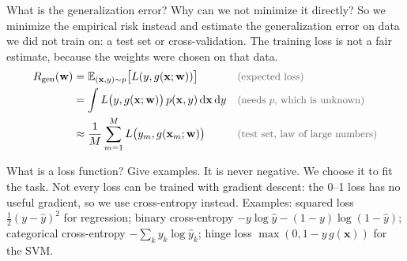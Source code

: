 \begin{qabox}{What is the generalization error? Why can we not minimize it directly?}
\explain So we minimize the empirical risk instead and estimate the generalization error on data we
did not train on: a test set or cross-validation. The training loss is not a fair estimate, because
the weights were chosen on that data.
\derive
\begin{align*}
\Rgen(\mathbf{w}) &= \mathbb{E}_{(\mathbf{x},y)\sim p}\bigl[L(y,g(\mathbf{x};\mathbf{w}))\bigr] \why{expected loss} \\
&= \int L\bigl(y,g(\mathbf{x};\mathbf{w})\bigr)\,p(\mathbf{x},y)\,\mathrm{d}\mathbf{x}\,\mathrm{d}y \why{needs $p$, which is unknown} \\
&\approx \frac{1}{M}\sum_{m=1}^{M} L\bigl(y_m,g(\mathbf{x}_m;\mathbf{w})\bigr) \why{test set, law of large numbers}
\end{align*}
\end{qabox}

\begin{qabox}{What is a loss function? Give examples.}
\explain It is never negative. We choose it to fit the task. Not every loss can be trained with
gradient descent: the 0--1 loss has no useful gradient, so we use cross-entropy instead.
\explain Examples: squared loss $\tfrac12(y-\hat y)^2$ for regression; binary cross-entropy
$-y\log\hat y - (1-y)\log(1-\hat y)$; categorical cross-entropy $-\sum_k y_k\log\hat y_k$; hinge
loss $\max(0, 1 - y\,g(\mathbf{x}))$ for the SVM.
\end{qabox}

